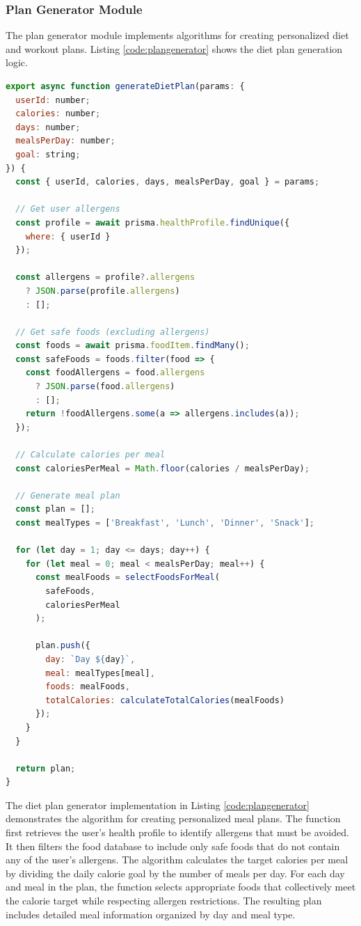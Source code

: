 \subsubsection{Plan Generator Module}

The plan generator module implements algorithms for creating personalized diet and workout plans. Listing \ref{code:plangenerator} shows the diet plan generation logic.

\begin{lstlisting}[language=JavaScript, caption=Diet Plan Generator Implementation, label=code:plangenerator]
export async function generateDietPlan(params: {
  userId: number;
  calories: number;
  days: number;
  mealsPerDay: number;
  goal: string;
}) {
  const { userId, calories, days, mealsPerDay, goal } = params;
  
  // Get user allergens
  const profile = await prisma.healthProfile.findUnique({
    where: { userId }
  });
  
  const allergens = profile?.allergens 
    ? JSON.parse(profile.allergens) 
    : [];
  
  // Get safe foods (excluding allergens)
  const foods = await prisma.foodItem.findMany();
  const safeFoods = foods.filter(food => {
    const foodAllergens = food.allergens 
      ? JSON.parse(food.allergens) 
      : [];
    return !foodAllergens.some(a => allergens.includes(a));
  });
  
  // Calculate calories per meal
  const caloriesPerMeal = Math.floor(calories / mealsPerDay);
  
  // Generate meal plan
  const plan = [];
  const mealTypes = ['Breakfast', 'Lunch', 'Dinner', 'Snack'];
  
  for (let day = 1; day <= days; day++) {
    for (let meal = 0; meal < mealsPerDay; meal++) {
      const mealFoods = selectFoodsForMeal(
        safeFoods, 
        caloriesPerMeal
      );
      
      plan.push({
        day: `Day ${day}`,
        meal: mealTypes[meal],
        foods: mealFoods,
        totalCalories: calculateTotalCalories(mealFoods)
      });
    }
  }
  
  return plan;
}
\end{lstlisting}

The diet plan generator implementation in Listing \ref{code:plangenerator} demonstrates the algorithm for creating personalized meal plans. The function first retrieves the user's health profile to identify allergens that must be avoided. It then filters the food database to include only safe foods that do not contain any of the user's allergens. The algorithm calculates the target calories per meal by dividing the daily calorie goal by the number of meals per day. For each day and meal in the plan, the function selects appropriate foods that collectively meet the calorie target while respecting allergen restrictions. The resulting plan includes detailed meal information organized by day and meal type.

